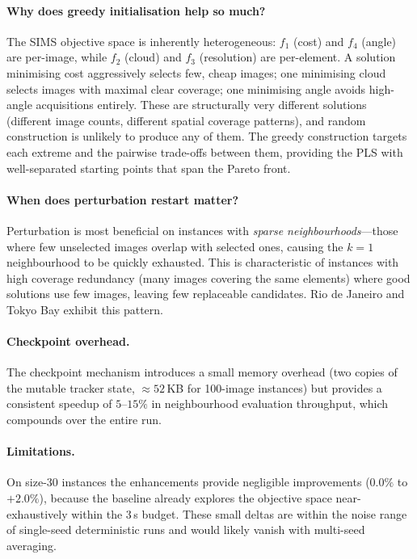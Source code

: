 \documentclass[11pt,a4paper]{article}
\begin{document}
\paragraph{Why does greedy initialisation help so much?}
The SIMS objective space is inherently heterogeneous: $f_1$ (cost) and
$f_4$ (angle) are per-image, while $f_2$ (cloud) and $f_3$ (resolution)
are per-element.  A solution minimising cost aggressively selects few,
cheap images; one minimising cloud selects images with maximal clear
coverage; one minimising angle avoids high-angle acquisitions entirely.
These are structurally very different solutions (different image counts,
different spatial coverage patterns), and random construction is
unlikely to produce any of them.  The greedy construction targets each
extreme and the pairwise trade-offs between them, providing the PLS with
well-separated starting points that span the Pareto front.

\paragraph{When does perturbation restart matter?}
Perturbation is most beneficial on instances with \emph{sparse
neighbourhoods}---those where few unselected images overlap with
selected ones, causing the $k{=}1$ neighbourhood to be quickly
exhausted.  This is characteristic of instances with high coverage
redundancy (many images covering the same elements) where good solutions
use few images, leaving few replaceable candidates.  Rio de Janeiro and
Tokyo Bay exhibit this pattern.

\paragraph{Checkpoint overhead.}
The checkpoint mechanism introduces a small memory overhead (two
copies of the mutable tracker state, ${\approx}52$\,KB for 100-image
instances) but provides a consistent speedup of $5$--$15\%$ in
neighbourhood evaluation throughput, which compounds over the entire
run.

\paragraph{Limitations.}
On size-30 instances the enhancements provide negligible improvements
($0.0\%$ to $+2.0\%$), because the baseline already explores the
objective space near-exhaustively within the 3\,s budget.  These small
deltas are within the noise range of single-seed deterministic runs and
would likely vanish with multi-seed averaging.
\end{document}
